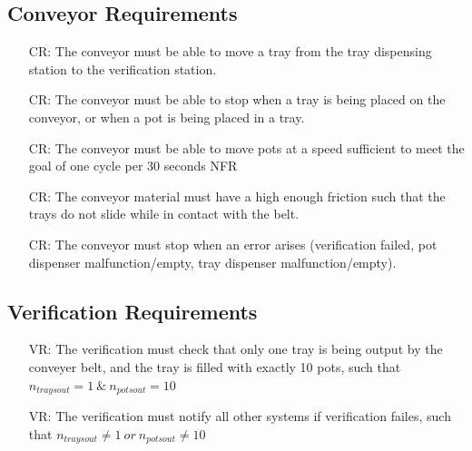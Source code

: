 \documentclass[12pt]{article}
\newcounter{creqnum} %
\newcounter{vreqnum} %
\begin{document}
\subsection{Conveyor Requirements}

\noindent \begin{itemize}

\item[CR\refstepcounter{creqnum}\thecreqnum \label{R_Conveyor}:] {The conveyor must
    be able to move a tray from the tray dispensing station to the verification station.}

\item[CR\refstepcounter{creqnum}\thecreqnum \label{R_Conveyor}:] {The conveyor must
    be able to stop when a tray is being placed on the conveyor, or when a pot is being
    placed in a tray.}

\item[CR\refstepcounter{creqnum}\thecreqnum \label{R_Conveyor}:] {The conveyor must
    be able to move pots at a speed sufficient to meet the goal of one cycle per 30
    seconds}
NFR
    
\item[CR\refstepcounter{creqnum}\thecreqnum \label{R_Conveyor}:] {The conveyor material 
    must have a high enough friction such that the trays do not slide while in contact with
    the belt.}

\item[CR\refstepcounter{creqnum}\thecreqnum \label{R_Conveyor}:] {The conveyor must
    stop when an error arises (verification failed, pot dispenser malfunction/empty, tray dispenser
    malfunction/empty).}

\end{itemize}

\subsection{Verification Requirements}

\noindent \begin{itemize}

\item[VR\refstepcounter{vreqnum}\thevreqnum \label{R_Verification}:] {The verification must
    check that only one tray is being output by the conveyer belt, and the tray is
    filled with exactly 10 pots, such that $n_{traysout}=1\ \&\ n_{potsout}=10$}

\item[VR\refstepcounter{vreqnum}\thevreqnum \label{R_Verification}:] {The verification must
    notify all other systems if verification failes, such that $n_{traysout}\neq1\ or\ n_{potsout}\neq10$}

\end{itemize}
\end{document}
